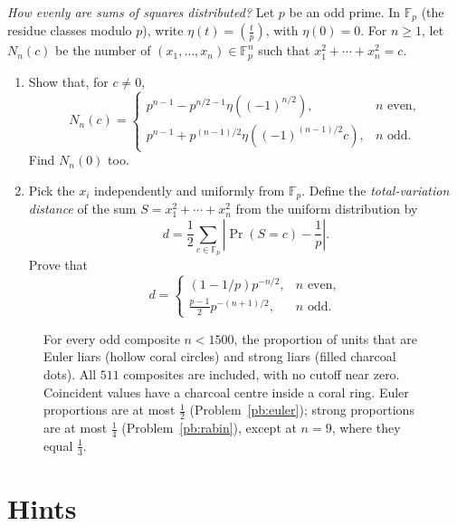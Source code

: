 \begin{exercise}[$\star\star$]\label{pb:sumsquares}
\emph{How evenly are sums of squares distributed?}
Let $p$ be an odd prime. In $\mathbb F_p$ (the residue classes modulo $p$),
write $\eta(t)=\left(\frac tp\right)$, with $\eta(0)=0$.
For $n\ge1$, let $N_n(c)$ be the number of
$(x_1,\ldots,x_n)\in\mathbb F_p^n$ such that
$x_1^2+\cdots+x_n^2=c$.
\begin{enumerate}[label=(\alph*)]
\item Show that, for $c\ne0$,
\[
N_n(c)=\begin{cases}
p^{n-1}-p^{n/2-1}\eta((-1)^{n/2}),&n\text{ even},\\[2pt]
p^{n-1}+p^{(n-1)/2}\eta((-1)^{(n-1)/2}c),&n\text{ odd}.
\end{cases}
\]
Find $N_n(0)$ too.
\item Pick the $x_i$ independently and uniformly from $\mathbb F_p$.
Define the \emph{total-variation distance} of the sum
$S=x_1^2+\cdots+x_n^2$ from the uniform distribution by
\[
d=\frac12\sum_{c\in\mathbb F_p}
\left|\Pr(S=c)-\frac1p\right|.
\]
Prove that
\[
d=\begin{cases}
(1-1/p)p^{-n/2},&n\text{ even},\\[2pt]
\frac{p-1}{2}p^{-(n+1)/2},&n\text{ odd}.
\end{cases}
\]
\end{enumerate}
\end{exercise}

\begin{figure}[ht]
\centering
{}
\caption{For every odd composite $n<1500$, the proportion of units that are Euler liars (hollow coral circles) and strong liars (filled charcoal dots). All $511$ composites are included, with no cutoff near zero. Coincident values have a charcoal centre inside a coral ring. Euler proportions are at most $\frac12$ (Problem~\ref{pb:euler}); strong proportions are at most $\frac14$ (Problem~\ref{pb:rabin}), except at $n=9$, where they equal $\frac13$.}
\label{fig:liars}
\end{figure}

\section{Hints}

